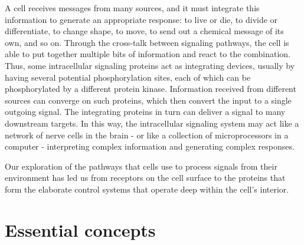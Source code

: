 A cell receives messages from many sources, and it must integrate this
information to generate an appropriate response: to live or die, to divide
or differentiate, to change shape, to move, to send out a chemical message
of its own, and so on. Through the cross-talk
between signaling pathways, the cell is able to put together multiple bits
of information and react to the combination. Thus, some intracellular
signaling proteins act as integrating devices, usually by having several
potential phosphorylation sites, each of which can be phosphorylated by
a different protein kinase. Information received from different sources
can converge on such proteins, which then convert the input to a single
outgoing signal. The integrating
proteins in turn can deliver a signal to many downstream targets. In this
way, the intracellular signaling system may act like a network of nerve
cells in the brain - or like a collection of microprocessors in a computer -
interpreting complex information and generating complex responses.

Our exploration of the pathways that cells use to process signals from
their environment has led us from receptors on the cell surface to the
proteins that form the elaborate control systems that operate deep within
the cell’s interior.

\section{Essential concepts}

